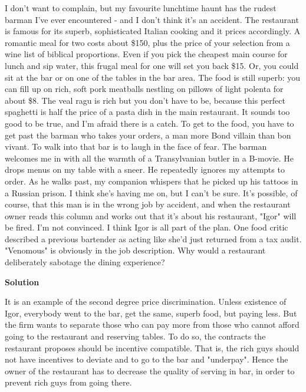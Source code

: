 \documentclass[a4paper]{article}
\begin{document}
		I don't want to complain, but my favourite lunchtime haunt has the rudest barman I've
		ever encountered - and I don't think it's an accident. The restaurant is famous for its
		superb, sophisticated Italian cooking and it prices accordingly. A romantic meal for two
		costs about \$150, plus the price of your selection from a wine list of biblical proportions.
		Even if you pick the cheapest main course for lunch and sip water, this frugal meal for
		one will set you back \$15.
		Or, you could sit at the bar or on one of the tables in the bar area. The food is still
		superb: you can fill up on rich, soft pork meatballs nestling on pillows of light polenta for
		about \$8. The veal ragu is rich but you don't have to be, because this perfect spaghetti
		is half the price of a pasta dish in the main restaurant.
		It sounds too good to be true, and I'm afraid there is a catch. To get to the food,
		you have to get past the barman who takes your orders, a man more Bond villain than
		bon vivant. To walk into that bar is to laugh in the face of fear. The barman welcomes
		me in with all the warmth of a Transylvanian butler in a B-movie. He drops menus on
		my table with a sneer. He repeatedly ignores my attempts to order. As he walks past,
		my companion whispers that he picked up his tattoos in a Russian prison. I think she's
		having me on, but I can't be sure.
		It's possible, of course, that this man is in the wrong job by accident, and when
		the restaurant owner reads this column and works out that it's about his restaurant,
		"Igor" will be fired. I'm not convinced. I think Igor is all part of the plan. One food
		critic described a previous bartender as acting like she'd just returned from a tax audit.
		"Venomous" is obviously in the job description.
		Why would a restaurant deliberately sabotage the dining experience?
		
		\textbf{Solution}
		
		
		It is an example of the second degree price discrimination. Unless existence of Igor, everybody went to the bar, get the same, superb food, but paying less. But the firm wants to separate those who can pay more from those who cannot afford going to the restaurant and reserving tables. To do so, the contracts the restaurant proposes should be incentive compatible. That is, the rich guys should not have incentives to deviate and to go to the bar and "underpay". Hence the owner of the restaurant has to decrease the quality of serving in bar, in order to prevent rich guys from going there.
		
\end{document}
